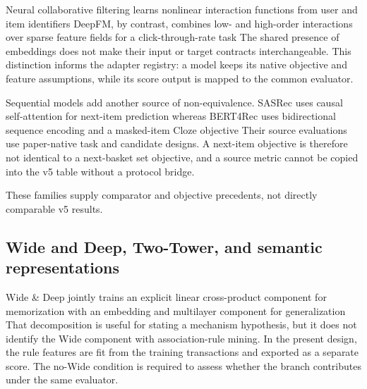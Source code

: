 \documentclass[10pt,a4paper]{article}
\begin{document}
Neural collaborative filtering learns nonlinear interaction functions from user
and item identifiers
\cite{he2017_ncf} %
DeepFM, by contrast, combines low- and high-order interactions over sparse
feature fields for a click-through-rate task
\cite{guo2017_deepfm} %
The shared presence of embeddings does not make their input or target contracts
interchangeable. This distinction informs the adapter registry: a model keeps
its native objective and feature assumptions, while its score output is mapped
to the common evaluator.

Sequential models add another source of non-equivalence. SASRec uses causal
self-attention for next-item prediction
\cite{kang2018_sasrec} %
whereas BERT4Rec uses bidirectional sequence encoding and a masked-item Cloze
objective
\cite{sun2019_bert4rec} %
Their source evaluations use paper-native task and candidate designs. A next-item
objective is therefore not identical to a next-basket set objective, and a
source metric cannot be copied into the v5 table without a protocol bridge.

These families supply comparator and objective precedents, not directly
comparable v5 results.

\subsection{Wide and Deep, Two-Tower, and semantic representations}

Wide \& Deep jointly trains an explicit linear cross-product component for
memorization with an embedding and multilayer component for generalization
\cite{cheng2016_wide_deep} %
That decomposition is useful for stating a mechanism hypothesis, but it does not
identify the Wide component with association-rule mining. In the present design,
the rule features are fit from the training transactions and exported as a
separate score. The no-Wide condition is required to assess whether the branch
contributes under the same evaluator.
\end{document}
